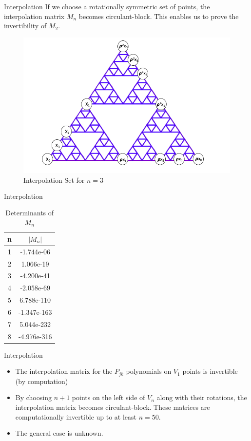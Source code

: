 \documentclass[xcolor = dvipsnames]{beamer}
\begin{document}
\begin{frame}{Interpolation}
    If we choose a rotationally symmetric set of points, the interpolation matrix $M_n$ becomes circulant-block. This enables us to prove the invertibility of $M_2$. 
    \begin{figure}[H]
        \centering
        \includegraphics[width=.65\linewidth]{Final_presentation/images/Samplings.png}
        \caption{Interpolation Set for $n=3$}
        \label{fig:vortex}
    \end{figure}
\end{frame}


\begin{frame}{Interpolation}
    \begin{table}[H]
        \centering
        \begin{tabular}{c|c}
        n&$|M_n|$\\
        \toprule
            1&-1.744e-06\\
              2&1.066e-19\\
              3&-4.200e-41\\
              4&-2.058e-69\\
              5&6.788e-110\\
              6&-1.347e-163\\
              7&5.044e-232\\
              8&-4.976e-316\\
        \end{tabular}
        \caption{Determinants of $M_n$}
        \label{tab:dets}
    \end{table}
    
\end{frame}

\begin{frame}{Interpolation}
    \begin{itemize}
        \item The interpolation matrix for the $P_{jk}$ polynomials on $V_1$ points is invertible (by computation)
        \item By choosing $n+1$ points on the left side of $V_n$ along with their rotations, the interpolation matrix becomes circulant-block. These matrices are computationally invertible up to at least $n = 50$.
        \item The general case is unknown.
    \end{itemize}
\end{frame}
\end{document}
